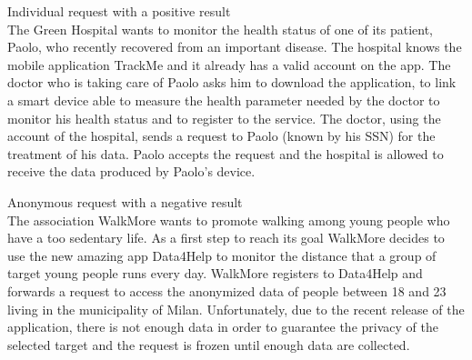 \documentclass{article}
\begin{document}
\begin{legal}
\begin{legal}
\begin{legal}
{\begin{legal}
\item Individual request with a positive result\\
 
The Green Hospital wants to monitor the health status of one of its patient, Paolo, who recently recovered from an important disease. The hospital knows the mobile application TrackMe and it already has a valid account on the app. The doctor who is taking care of Paolo asks him to download the application, to link a smart device able to measure the health parameter needed by the doctor to monitor his health status and to register to the service. The doctor, using the account of the hospital, sends a request to Paolo (known by his SSN) for the treatment of his data. Paolo accepts the request and the hospital is allowed to receive the data produced by Paolo’s device.\\

\item Anonymous request with a negative result\\

The association WalkMore wants to promote walking among young people who have a too sedentary life. As a first step to reach its goal WalkMore decides to use the new amazing app Data4Help to monitor the distance that a group of target young people runs every day. WalkMore registers to Data4Help and forwards a request to access the anonymized data of people between 18 and 23 living in the municipality of Milan. Unfortunately, due to the recent release of the application, there is not enough data in order to guarantee the privacy of the selected target and the request is frozen until enough data are collected.  \\


\end{legal}}
\end{legal}
\end{legal}
\end{legal}
\end{document}
